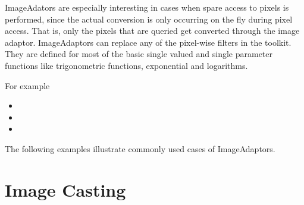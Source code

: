 ImageAdators are especially interesting in cases when spare access to pixels is
performed, since the actual conversion is only occurring on the fly during
pixel access. That is, only the pixels that are queried get converted through
the image adaptor.  ImageAdaptors can replace any of the pixel-wise filters in
the toolkit. They are defined for most of the basic single valued and single
parameter functions like trigonometric functions, exponential and logarithms.

For example

\begin{itemize}
\item {}
\item {}
\item {}
\end{itemize}

The following examples illustrate commonly used cases of ImageAdaptors.

\section{Image Casting}
\label{sec:ImageAdaptorForBasicCasting}



